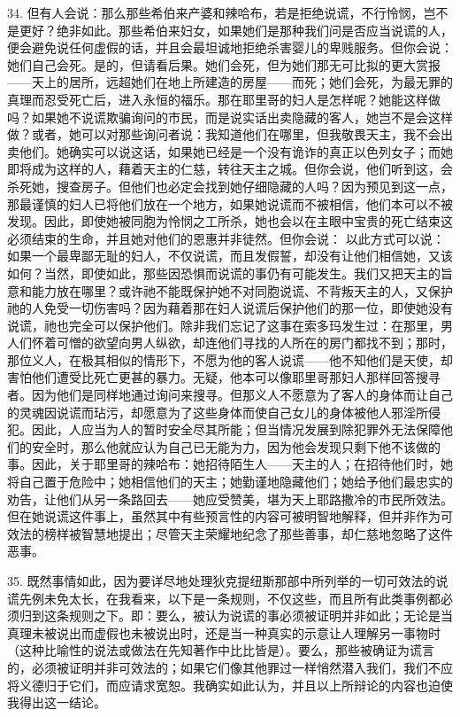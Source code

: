 34. 但有人会说：那么那些希伯来产婆和辣哈布，若是拒绝说谎，不行怜悯，岂不是更好？绝非如此。那些希伯来妇女，如果她们是那种我们问是否应当说谎的人，便会避免说任何虚假的话，并且会最坦诚地拒绝杀害婴儿的卑贱服务。但你会说：她们自己会死。是的，但请看后果。她们会死，但为她们那无可比拟的更大赏报——天上的居所，远超她们在地上所建造的房屋——而死；她们会死，为最无罪的真理而忍受死亡后，进入永恒的福乐。那在耶里哥的妇人是怎样呢？她能这样做吗？如果她不说谎欺骗询问的市民，而是说实话出卖隐藏的客人，她岂不是会这样做？或者，她可以对那些询问者说：我知道他们在哪里，但我敬畏天主，我不会出卖他们。她确实可以说这话，如果她已经是一个没有诡诈的真正以色列女子；而她即将成为这样的人，藉着天主的仁慈，转往天主之城。但你会说，他们听到这，会杀死她，搜查房子。但他们也必定会找到她仔细隐藏的人吗？因为预见到这一点，那最谨慎的妇人已将他们放在一个地方，如果她说谎而不被相信，他们本可以不被发现。因此，即使她被同胞为怜悯之工所杀，她也会以在主眼中宝贵的死亡结束这必须结束的生命，并且她对他们的恩惠并非徒然。但你会说： 以此方式可以说：如果一个最卑鄙无耻的妇人，不仅说谎，而且发假誓，却没有让他们相信她，又该如何？当然，即使如此，那些因恐惧而说谎的事仍有可能发生。我们又把天主的旨意和能力放在哪里？或许祂不能既保护她不对同胞说谎、不背叛天主的人，又保护祂的人免受一切伤害吗？因为藉着那在妇人说谎后保护他们的那一位，即使她没有说谎，祂也完全可以保护他们。除非我们忘记了这事在索多玛发生过：在那里，男人们怀着可憎的欲望向男人纵欲，却连他们寻找的人所在的房门都找不到；那时，那位义人，在极其相似的情形下，不愿为他的客人说谎——他不知他们是天使，却害怕他们遭受比死亡更甚的暴力。无疑，他本可以像耶里哥那妇人那样回答搜寻者。因为他们是同样地通过询问来搜寻。但那义人不愿意为了客人的身体而让自己的灵魂因说谎而玷污，却愿意为了这些身体而使自己女儿的身体被他人邪淫所侵犯。因此，人应当为人的暂时安全尽其所能；但当情况发展到除犯罪外无法保障他们的安全时，那么他就应认为自己已无能为力，因为他会发现只剩下他不该做的事。因此，关于耶里哥的辣哈布：她招待陌生人——天主的人；在招待他们时，她将自己置于危险中；她相信他们的天主；她勤谨地隐藏他们；她给予他们最忠实的劝告，让他们从另一条路回去——她应受赞美，堪为天上耶路撒冷的市民所效法。但在她说谎这件事上，虽然其中有些预言性的内容可被明智地解释，但并非作为可效法的榜样被智慧地提出；尽管天主荣耀地纪念了那些善事，却仁慈地忽略了这件恶事。\par

35. 既然事情如此，因为要详尽地处理狄克提纽斯那部中所列举的一切可效法的说谎先例未免太长，在我看来，以下是一条规则，不仅这些，而且所有此类事例都必须归到这条规则之下。即：要么，被认为说谎的事必须被证明并非如此；无论是当真理未被说出而虚假也未被说出时，还是当一种真实的示意让人理解另一事物时（这种比喻性的说法或做法在先知著作中比比皆是）。要么，那些被确证为谎言的，必须被证明并非可效法的；如果它们像其他罪过一样悄然潜入我们，我们不应将义德归于它们，而应请求宽恕。我确实如此认为，并且以上所辩论的内容也迫使我得出这一结论。\par

